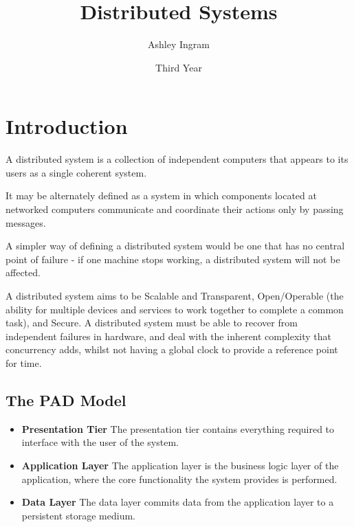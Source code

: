 \documentclass{article}
\begin{document}
\setcounter{tocdepth}{4}
\title{Distributed Systems}
\date{Third Year}
\author{Ashley Ingram}
\maketitle
\tableofcontents
\pagebreak

\section{Introduction}
A distributed system is a collection of independent computers that appears to its users as a single coherent system. 

It may be alternately defined as a system in which components located at networked computers communicate and coordinate their actions only by passing messages. 

A simpler way of defining a distributed system would be one that has no central point of failure - if one machine stops working, a distributed system will not be affected.

A distributed system aims to be Scalable and Transparent, Open/Operable (the ability for multiple devices and services to work together to complete a common task), and Secure. A distributed system must be able to recover from independent failures in hardware, and deal with the inherent complexity that concurrency adds, whilst not having a global clock to provide a reference point for time.

\subsection{The PAD Model}
\begin{itemize}
    \item \textbf{Presentation Tier}
    The presentation tier contains everything required to interface with the user of the system.
    \item \textbf{Application Layer}
    The application layer is the business logic layer of the application, where the core functionality the system provides is performed.
    \item \textbf{Data Layer}
    The data layer commits data from the application layer to a persistent storage medium. 
\end{itemize}
\end{document}
